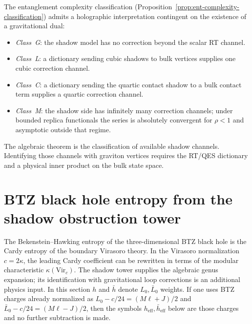 \begin{remark}
\label{rem:ent-gravitational-complexity}
The entanglement complexity classification
(Proposition~\ref{prop:ent-complexity-classification})
admits a holographic interpretation
contingent on the existence of a gravitational dual:
\begin{itemize}
\item \emph{Class~G}: the shadow model has no correction beyond the
 scalar RT channel.
\item \emph{Class~L}: a dictionary sending cubic shadows to bulk
 vertices supplies one cubic correction channel.
\item \emph{Class~C}: a dictionary sending the quartic contact shadow
 to a bulk contact term supplies a quartic correction channel.
\item \emph{Class~M}: the shadow side has infinitely many correction
 channels; under bounded replica functionals the series is absolutely
 convergent for $\rho < 1$ and asymptotic outside that regime.
\end{itemize}
The algebraic theorem is the classification of available shadow
channels.  Identifying those channels with graviton vertices requires
the RT/QES dictionary and a physical inner product on the bulk state
space.
\end{remark}

%
%

\section{BTZ black hole entropy from the shadow obstruction tower}
\label{sec:ent-btz}

The Bekenstein--Hawking entropy of the three-dimensional
BTZ black hole \cite{BTZ92} is the Cardy entropy of the
boundary Virasoro theory.  In the Virasoro normalization
$c=2\kappa$, the leading Cardy coefficient can be rewritten in
terms of the modular characteristic $\kappa(\mathrm{Vir}_c)$.
The shadow tower supplies the algebraic genus expansion; its
identification with gravitational loop corrections is an additional
physics input.
In this section $h$ and $\bar h$ denote $L_0,\bar L_0$ weights.  If
one uses BTZ charges already normalized as
$L_0-c/24=(M\ell+J)/2$ and
$\bar L_0-c/24=(M\ell-J)/2$, then the symbols
$h_{\mathrm{eff}},\bar h_{\mathrm{eff}}$ below are those charges and
no further subtraction is made.

